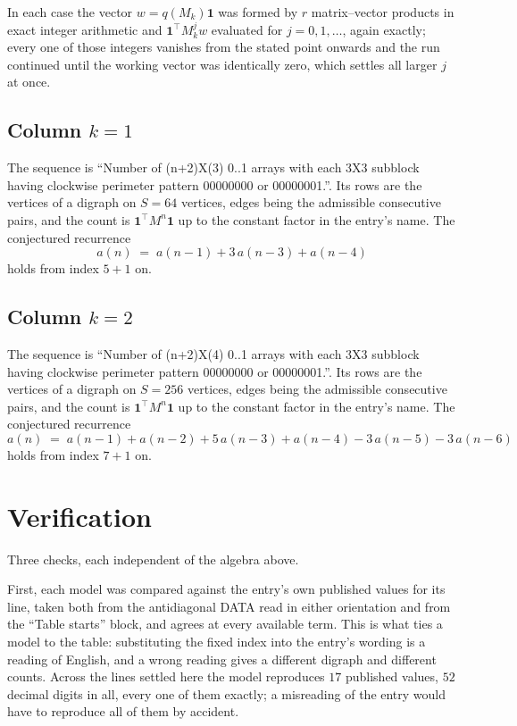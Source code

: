\documentclass[11pt,a4paper]{article}
\theoremstyle{plain}
\theoremstyle{definition}
\begin{document}
In each case the vector $w=q(M_k)\mathbf{1}$ was formed by $r$ matrix--vector products in
exact integer arithmetic and $\mathbf{1}^{\!\top}M_k^{j}w$ evaluated for $j=0,1,\dots$,
again exactly; every one of those integers vanishes from the stated point onwards and the run
continued until the working vector was identically zero, which settles all larger $j$ at once.

\subsection*{Column $k$$=1$}
The sequence is ``Number of (n+2)X(3) 0..1 arrays with each 3X3 subblock having clockwise perimeter pattern 00000000 or 00000001.''. Its rows are the vertices of a digraph on
$S=64$ vertices, edges being the admissible consecutive pairs, and the count is
$\mathbf{1}^{\!\top}M^{n}\mathbf{1}$ up to the constant factor in the entry's name.
The conjectured recurrence
\[
a(n)\;=\;a(n-1) + 3\,a(n-3) + a(n-4)
\]
holds from index $5+1$ on.

\subsection*{Column $k$$=2$}
The sequence is ``Number of (n+2)X(4) 0..1 arrays with each 3X3 subblock having clockwise perimeter pattern 00000000 or 00000001.''. Its rows are the vertices of a digraph on
$S=256$ vertices, edges being the admissible consecutive pairs, and the count is
$\mathbf{1}^{\!\top}M^{n}\mathbf{1}$ up to the constant factor in the entry's name.
The conjectured recurrence
\[
a(n)\;=\;a(n-1) + a(n-2) + 5\,a(n-3) + a(n-4) - 3\,a(n-5) - 3\,a(n-6)
\]
holds from index $7+1$ on.

\section{Verification}

Three checks, each independent of the algebra above.

First, each model was compared against the entry's own published values for its line, taken
both from the antidiagonal DATA read in either orientation and from the ``Table starts''
block, and agrees at every available term. This is what ties a model to the table:
substituting the fixed index into the entry's wording is a reading of English, and a wrong
reading gives a different digraph and different counts. Across the lines settled here the
model reproduces $17$ published values, $52$ decimal digits in all, every one of
them exactly; a misreading of the entry would have to reproduce all of them by accident.
\end{document}
